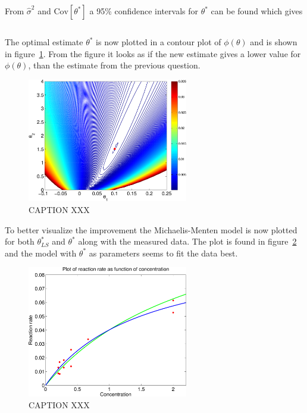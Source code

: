 From $\hat{\sigma}^2$ and $\text{Cov}[\theta^*]$ a 95\% confidence intervals for $\theta^*$ can be found which gives

\begin{equation*}
    
\end{equation*}

The optimal estimate $\theta^*$ is now plotted in a contour plot of $\phi(\theta)$ and is shown in figure~\ref{fig:ex22-contour-marquardt}. From the figure it looks as if the new estimate gives a lower value for $\phi(\theta)$, than the estimate from the previous question. 

\begin{figure}[ht]
    \centering
    \includegraphics[width=70mm]{../media/ex22-contour-marquardt.pdf}
    \caption{CAPTION XXX}
    \label{fig:ex22-contour-marquardt}
\end{figure}

To better visualize the improvement the Michaelis-Menten model is now plotted for both $\theta_{LS}^*$ and $\theta^*$ along with the measured data. The plot is found in figure~\ref{fig:ex22-models} and the model with $\theta^*$ as parameters seems to fit the data best.

\begin{figure}[ht]
    \centering
    \includegraphics[width=70mm]{../media/ex22-models-with-data.pdf}
    \caption{CAPTION XXX}
    \label{fig:ex22-models}
\end{figure}


